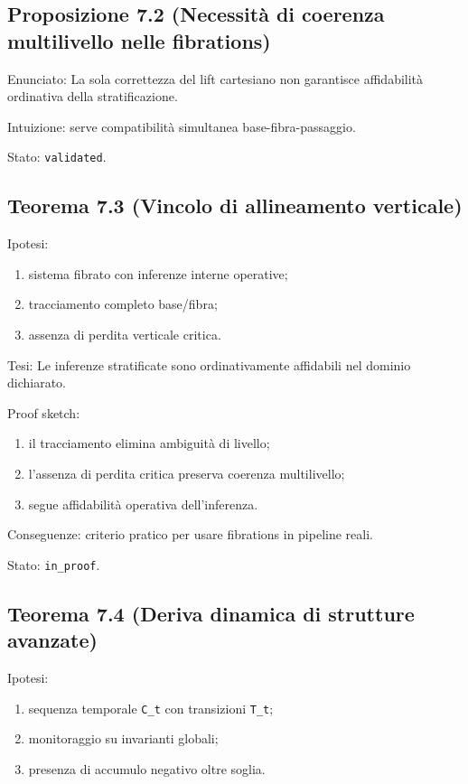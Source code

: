 \subsection{Proposizione 7.2 (Necessità di coerenza multilivello nelle fibrations)}

Enunciato:
La sola correttezza del lift cartesiano non garantisce affidabilità ordinativa della stratificazione.

Intuizione:
serve compatibilità simultanea base-fibra-passaggio.

Stato: \texttt{validated}.

\subsection{Teorema 7.3 (Vincolo di allineamento verticale)}

Ipotesi:

\begin{enumerate}
\def\labelenumi{\arabic{enumi}.}
\tightlist
\item
  sistema fibrato con inferenze interne operative;
\item
  tracciamento completo base/fibra;
\item
  assenza di perdita verticale critica.
\end{enumerate}

Tesi:
Le inferenze stratificate sono ordinativamente affidabili nel dominio dichiarato.

Proof sketch:

\begin{enumerate}
\def\labelenumi{\arabic{enumi}.}
\tightlist
\item
  il tracciamento elimina ambiguità di livello;
\item
  l'assenza di perdita critica preserva coerenza multilivello;
\item
  segue affidabilità operativa dell'inferenza.
\end{enumerate}

Conseguenze:
criterio pratico per usare fibrations in pipeline reali.

Stato: \texttt{in\_proof}.

\subsection{Teorema 7.4 (Deriva dinamica di strutture avanzate)}

Ipotesi:

\begin{enumerate}
\def\labelenumi{\arabic{enumi}.}
\tightlist
\item
  sequenza temporale \texttt{C\_t} con transizioni \texttt{T\_t};
\item
  monitoraggio su invarianti globali;
\item
  presenza di accumulo negativo oltre soglia.
\end{enumerate}

